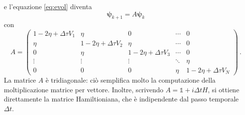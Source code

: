 \documentclass[a4paper, titlepage]{article}
\numberwithin{equation}{section}
\begin{document}
e l'equazione \eqref{eq:evol} diventa
\begin{equation}
    \bm{\psi}_{k+1} = A\bm{\psi}_k
    \label{eq:evol_mat}
\end{equation}
con
\begin{equation*} 
    A = \begin{pmatrix}
    1-2\eta + \Delta\tau V_1 & \eta & 0 & \cdots & 0 \\
    \eta & 1-2\eta + \Delta\tau V_2 & \eta & \cdots & 0 \\
     0 & \eta & 1-2\eta + \Delta\tau V_3 & \cdots & 0 \\
    \vdots & \vdots & \vdots & \ddots & \eta \\
    0 & 0 & 0 & \eta & 1-2\eta + \Delta\tau V_N 
    \end{pmatrix}\, . 
\end{equation*}
La matrice $A$ è tridiagonale: ciò semplifica molto la computazione della moltiplicazione matrice per vettore. Inoltre, scrivendo $A = \mathbb{1} + i\Delta t H$, si ottiene direttamente la matrice Hamiltioniana, che è indipendente dal passo temporale $\Delta t$.
\end{document}
